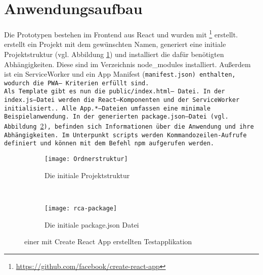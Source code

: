 \section{Anwendungsaufbau}
Die Prototypen bestehen im Frontend aus React und wurden mit \footnote{\url{https://github.com/facebook/create-react-app}} erstellt.  erstellt ein Projekt mit dem gewünschten Namen, generiert eine initiale Projektstruktur (vgl. Abbildung \ref{fig:init}) und installiert die dafür benötigten Abhängigkeiten. Diese sind im Verzeichnis node\_modules installiert.
Außerdem ist ein ServiceWorker und ein App Manifest (\tt{manifest.json}) enthalten, wodurch die \gls{PWA}-- Kriterien erfüllt sind.\\
Als Template gibt es nun die \tt{public/index.html}-- Datei. In der \tt{index.js}--Datei werden die React--Komponenten und der ServiceWorker initialisiert.. Alle \tt{App.*}--Dateien umfassen eine minimale Beispielanwendung.
In der generierten \tt{package.json}--Datei (vgl. Abbildung \ref{fig:init2}), befinden sich Informationen über die Anwendung und ihre Abhängigkeiten. Im Unterpunkt \tt{scripts} werden Kommandozeilen-Aufrufe definiert und können mit dem Befehl \tt{npm} aufgerufen werden.
\begin{figure}[H]
  \centering
  \begin{subfigure}[t]{0.45\textwidth}
          \texttt{[image: Ordnerstruktur]}
          \caption{Die initiale Projektstruktur}
          \label{fig:init}
  \end{subfigure}
  ~ 
  \begin{subfigure}[t]{0.45\textwidth}
          \texttt{[image: rca-package]}
          \caption{Die initiale package.json Datei}
          \label{fig:init2}
  \end{subfigure}
  \grayRule
  \caption[Create React App: initiale Testapplikation]{einer mit Create React App erstellten Testapplikation}
  \label{fig:create-react-app}
\end{figure}
%
%
%
%
%
